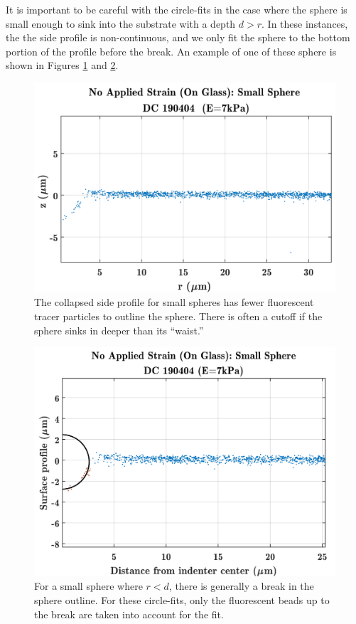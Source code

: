 It is important to be careful with the circle-fits in the case where the sphere is small enough to sink into the substrate with a depth $ d > r $. In these instances, the the side profile is non-continuous, and we only fit the sphere to the bottom portion of the profile before the break. An example of one of these sphere is shown in Figures \ref{fig:smallsphere017190404dcglass} and \ref{fig:smallsphere017ciclefitspheredc}.
\begin{figure}[h!]
	\centering
	\includegraphics[width=\linewidth]{Chapters/Figures/smallsphere017_190404_DC_glass}
	\caption[Small Sphere Side Profile]{The collapsed side profile for small spheres has fewer fluorescent tracer particles to outline the sphere. There is often a cutoff if the sphere sinks in deeper than its ``waist.''}
	\label{fig:smallsphere017190404dcglass}
\end{figure}
\begin{figure}[h!]
	\centering
	\includegraphics[width=\linewidth]{Chapters/Figures/smallsphere017_cicle_fitsphere_DC}
	\caption[Small Sphere Circle Fit]{For a small sphere where $r<d$, there is generally a break in the sphere outline. For these circle-fits, only the fluorescent beads up to the break are taken into account for the fit.}
	\label{fig:smallsphere017ciclefitspheredc}
\end{figure}




